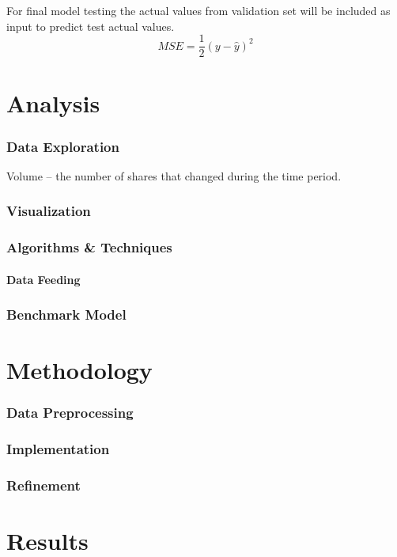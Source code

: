 \documentclass[a4paper,12pt]{article}
\begin{document}
For final model testing the actual values from validation set will be included as input to predict test actual values.
\begin{equation}
	\label{MSE}
	MSE = \frac{1}{2} \left( y - \hat{y} \right)^2
\end{equation}


\part{Analysis}
\section{Data Exploration}
Volume -- the number of shares that changed during the time period.

\section{Visualization}
\section{Algorithms \& Techniques}
\subsection{Data Feeding}
\section{Benchmark Model}


\part{Methodology}
\section{Data Preprocessing}
\section{Implementation}
\section{Refinement}


\part{Results}
\end{document}
